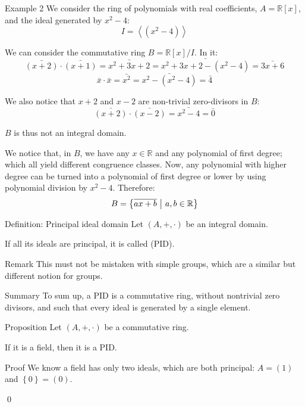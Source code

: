 \documentclass[a4paper]{article}
\begin{document}
\begin{parag}{Example 2}
    We consider the ring of polynomials with real coefficients, $A = \mathbb{R}\left[x\right]$, and the ideal generated by $x^2 - 4$: 
    \[I = \left\langle \left(x^2 - 4\right) \right\rangle\]
    
    We can consider the commutative ring $B = \mathbb{R}\left[x\right] / I$. In it: 
    \[\bar{\left(x + 2\right)}\cdot \bar{\left(x + 1\right)} = \bar{x^2 + 3x + 2} = \bar{x^2 + 3x + 2 - \left(x^2 - 4\right)} = \bar{3x + 6}\] 
    \[\bar{x}\cdot \bar{x} = \bar{x^2} = \bar{x^2 - \left(x^2 - 4\right)} = \bar{4}\]
    
    We also notice that $x+2$ and $x-2$ are non-trivial zero-divisors in $B$: 
    \[\bar{\left(x+2\right)}\cdot \bar{\left(x-2\right)} = \bar{x^2 - 4} = \bar{0}\]
    
    $B$ is thus not an integral domain.

    We notice that, in $B$, we have any $x \in \mathbb{R}$ and any polynomial of first degree; which all yield different congruence classes. Now, any polynomial with higher degree can be turned into a polynomial of first degree or lower by using polynomial division by $x^2 - 4$. Therefore: 
    \[B = \left\{\bar{ax + b} \suchthat a, b \in \mathbb{R}\right\}\]
\end{parag}

\begin{parag}{Definition: Principal ideal domain}
    Let $\left(A, +, \cdot \right)$ be an integral domain.

    If all its ideals are principal, it is called  (PID).

    \begin{subparag}{Remark}
        This must not be mistaken with simple groups, which are a similar but different notion for groups.
    \end{subparag}

    \begin{subparag}{Summary}
        To sum up, a PID is a commutative ring, without nontrivial zero divisors, and such that every ideal is generated by a single element.
    \end{subparag}
\end{parag}


\begin{parag}{Proposition}
    Let $\left(A, +, \cdot \right)$ be a commutative ring.

    If it is a field, then it is a PID.

    \begin{subparag}{Proof}
        We know a field has only two ideals, which are both principal: $A = \left(1\right)$ and $\left\{0\right\} = \left(0\right)$.

        \qed
    \end{subparag}
\end{parag}
\end{document}
